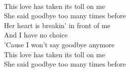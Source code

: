 \\
This love has taken its toll on me \\
She said goodbye too many times before \\
Her heart is breakin' in front of me \\
And I have no choice \\
'Cause I won't say goodbye anymore \\
This love has taken its toll on me \\
She said goodbye too many times before
